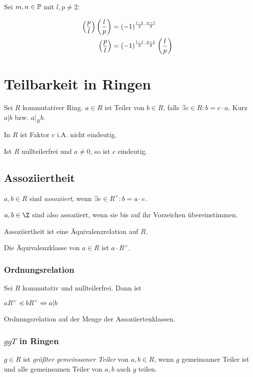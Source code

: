 Sei $m, n \in \mathbb{P}$ mit $l, p \neq 2$:

\vspace*{-4mm}
\begin{align*}
	\left(\frac{p}{l}\right)\left(\frac{l}{p}\right) &= (-1)^{\frac{l-1}{2}\cdot\frac{p-1}{2}} \\
	\left(\frac{p}{l}\right) &= (-1)^{\frac{l-1}{2}\cdot\frac{p-1}{2}} \left(\frac{l}{p}\right)
\end{align*}

\section*{Teilbarkeit in Ringen}

Sei $R$ kommutativer Ring. $a \in R$ ist Teiler von $b \in R$, falls $\exists c \in R : b = c \cdot a$. Kurz $a | b$ bzw. $a |_R b$.

In $R$ ist Faktor $c$ i.A. nicht eindeutig.

Ist $R$ nullteilerfrei und $a \neq 0$, so ist $c$ eindeutig.

\subsection*{Assoziiertheit}

$a, b \in R$ sind \emph{assoziiert}, wenn $\exists e \in R^\times : b = a\cdot e$.

$a, b \in \Z$ sind also assoziiert, wenn sie bis auf ihr Vorzeichen übereinstimmen.

Assoziiertheit ist eine Äquivalenzrelation auf $R$.

Die Äquivalenzklasse von $a \in R$ ist $a \cdot R^\times$.

\subsubsection*{Ordnungsrelation}

Sei $R$ kommutativ und nullteilerfrei. Dann ist

$aR^\times \preccurlyeq bR^\times \iff a | b$

Ordnungsrelation auf der Menge der Assoziiertenklassen.

\subsubsection*{$ggT$ in Ringen}

$g \in R$ ist \emph{größter gemeinsamer Teiler} von $a, b \in R$, wenn $g$ gemeinsamer Teiler ist und alle gemeinsamen Teiler von $a, b$ auch $g$ teilen.

